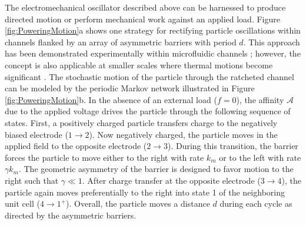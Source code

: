 \begin{appendices}
The electromechanical oscillator described above can be harnessed to produce directed motion or perform mechanical work against an applied load. Figure \ref{fig:PoweringMotion}a shows one strategy for rectifying particle oscillations within channels flanked by an array of asymmetric barriers with period $d$. This approach has been demonstrated experimentally within microfluidic channels \cite{drews2013ratcheted}; however, the concept is also applicable at smaller scales where thermal motions become significant \cite{kowalik2016ratcheted}. The stochastic motion of the particle through the ratcheted channel can be modeled by the periodic Markov network illustrated in Figure \ref{fig:PoweringMotion}b. In the absence of an external load ($f=0$), the affinity $\mathcal{A}$ due to the applied voltage drives the particle through the following sequence of states. First, a positively charged particle transfers charge to the negatively biased electrode ($1\rightarrow2$). Now negatively charged, the particle moves in the applied field to the opposite electrode ($2\rightarrow3$). During this transition, the barrier forces the particle to move either to the right with rate $k_m$ or to the left with rate $\gamma k_m$. The geometric asymmetry of the barrier is designed to favor motion to the right such that $\gamma \ll 1$. After charge transfer at the opposite electrode ($3\rightarrow 4$), the particle again moves preferentially to the right into state 1 of the neighboring unit cell ($4\rightarrow 1^+$). Overall, the particle moves a distance $d$ during each cycle as directed by the asymmetric barriers.


\end{appendices}
